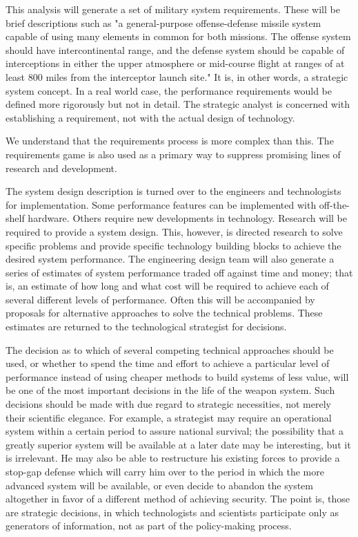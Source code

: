 This analysis will generate a set of military system requirements. These will be brief descriptions such as "a general-purpose offense-defense missile system capable of using many elements in common for both missions. The offense system should have intercontinental range, and the defense system should be capable of interceptions in either the upper atmosphere or mid-course flight at ranges of at least 800 miles from the interceptor launch site." It is, in other words, a strategic system concept. In a real world case, the performance requirements would be defined more rigorously but not in detail. The strategic analyst is concerned with establishing a requirement, not with the actual design of technology.

\begin{mdframed}[backgroundcolor=black!10]
We understand that the requirements process is more complex than this. The requirements game is also used as a primary way to suppress promising lines of research and development.
\end{mdframed}


The system design description is turned over to the engineers and technologists for implementation. Some performance features can be implemented with off-the-shelf hardware. Others require new developments in technology. Research will be required to provide a system design. This, however, is directed research to solve specific problems and provide specific technology building blocks to achieve the desired system performance. The engineering design team will also generate a series of estimates of system performance traded off against time and money; that is, an estimate of how long and what cost will be required to achieve each of several different levels of performance. Often this will be accompanied by proposals for alternative approaches to solve the technical problems. These estimates are returned to the technological strategist for decisions.

The decision as to which of several competing technical approaches should be used, or whether to spend the time and effort to achieve a particular level of performance instead of using cheaper methods to build systems of less value, will be one of the most important decisions in the life of the weapon system. Such decisions should be made with due regard to strategic necessities, not merely their scientific elegance. For example, a strategist may require an operational system within a certain period to assure national survival; the possibility that a greatly superior system will be available at a later date may be interesting, but it is irrelevant. He may also be able to restructure his existing forces to provide a stop-gap defense which will carry him over to the period in which the more advanced system will be available, or even decide to abandon the system altogether in favor of a different method of achieving security. The point is, those are strategic decisions, in which technologists and scientists participate only as generators of information, not as part of the policy-making process.

